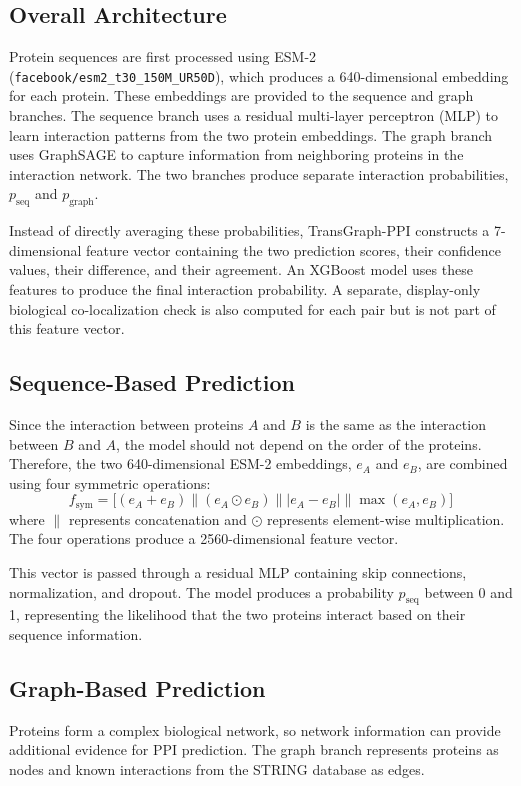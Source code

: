 \documentclass[conference]{IEEEtran}
\newcommand{\pseq}{p_{\mathrm{seq}}}
\newcommand{\pgraph}{p_{\mathrm{graph}}}
\begin{document}
\subsection{Overall Architecture}\label{AA}
Protein sequences are first processed using ESM-2
(\texttt{facebook/esm2\_t30\_150M\_UR50D}), which produces a 640-dimensional
embedding for each protein. These embeddings are provided to the sequence and
graph branches. The sequence branch uses a residual multi-layer perceptron
(MLP) to learn interaction patterns from the two protein embeddings. The graph
branch uses GraphSAGE to capture information from neighboring proteins in the
interaction network. The two branches produce separate interaction
probabilities, $\pseq$ and $\pgraph$.

Instead of directly averaging these probabilities, TransGraph-PPI constructs a
7-dimensional feature vector containing the two prediction scores, their
confidence values, their difference, and their agreement. An XGBoost model
uses these features to produce the final interaction probability. A separate,
display-only biological co-localization check is also computed for each pair
but is not part of this feature vector.

\subsection{Sequence-Based Prediction}\label{sec:seq}
Since the interaction between proteins $A$ and $B$ is the same as the
interaction between $B$ and $A$, the model should not depend on the order of
the proteins. Therefore, the two 640-dimensional ESM-2 embeddings, $e_A$ and
$e_B$, are combined using four symmetric operations:
\begin{equation}
f_{\mathrm{sym}} =
\bigl[
(e_A + e_B)
\parallel
(e_A \odot e_B)
\parallel
|e_A - e_B|
\parallel
\max(e_A,e_B)
\bigr]
\label{eq:sym}
\end{equation}
where $\parallel$ represents concatenation and $\odot$ represents element-wise
multiplication. The four operations produce a 2560-dimensional feature vector.

This vector is passed through a residual MLP containing skip connections,
normalization, and dropout. The model produces a probability $\pseq$ between 0
and 1, representing the likelihood that the two proteins interact based on
their sequence information.

\subsection{Graph-Based Prediction}\label{sec:graph}
Proteins form a complex biological network, so network information can provide
additional evidence for PPI prediction. The graph branch represents proteins as
nodes and known interactions from the STRING database as edges.
\end{document}
